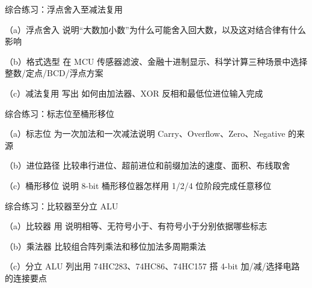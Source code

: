 \begin{chapterexercise}{综合练习：浮点舍入至减法复用}
\begin{exercisesubproblem}{（a）浮点舍入}
说明“大数加小数”为什么可能舍入回大数，以及这对结合律有什么影响
\end{exercisesubproblem}
\begin{exercisesubproblem}{（b）格式选型}
在 MCU 传感器滤波、金融十进制显示、科学计算三种场景中选择整数/定点/BCD/浮点方案
\end{exercisesubproblem}
\begin{exercisesubproblem}{（c）减法复用}
写出  如何由加法器、XOR 反相和最低位进位输入完成
\end{exercisesubproblem}
\end{chapterexercise}

\begin{chapterexercise}{综合练习：标志位至桶形移位}
\begin{exercisesubproblem}{（a）标志位}
为一次加法和一次减法说明 Carry、Overflow、Zero、Negative 的来源
\end{exercisesubproblem}
\begin{exercisesubproblem}{（b）进位路径}
比较串行进位、超前进位和前缀加法的速度、面积、布线取舍
\end{exercisesubproblem}
\begin{exercisesubproblem}{（c）桶形移位}
说明 8-bit 桶形移位器怎样用 1/2/4 位阶段完成任意移位
\end{exercisesubproblem}
\end{chapterexercise}

\begin{chapterexercise}{综合练习：比较器至分立 ALU}
\begin{exercisesubproblem}{（a）比较器}
用  说明相等、无符号小于、有符号小于分别依据哪些标志
\end{exercisesubproblem}
\begin{exercisesubproblem}{（b）乘法器}
比较组合阵列乘法和移位加法多周期乘法
\end{exercisesubproblem}
\begin{exercisesubproblem}{（c）分立 ALU}
列出用 74HC283、74HC86、74HC157 搭 4-bit 加/减/选择电路的连接要点
\end{exercisesubproblem}
\end{chapterexercise}

